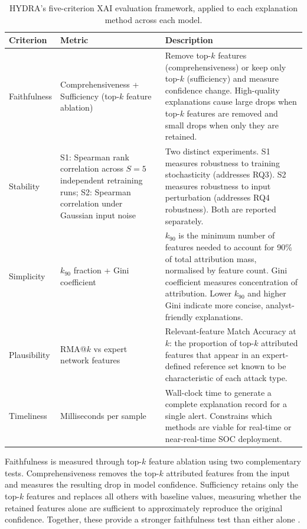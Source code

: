 \documentclass[12pt,a4paper]{report}
\begin{document}
\begin{table}[H]
\centering
\caption{HYDRA's five-criterion XAI evaluation framework, applied to each explanation method across each model.}
\label{tab:five-criteria}
\small
\begin{tabularx}{\textwidth}{lp{3.5cm}X}
\toprule
\textbf{Criterion} & \textbf{Metric} & \textbf{Description} \\
\midrule
Faithfulness & Comprehensiveness + Sufficiency (top-$k$ feature ablation) & Remove top-$k$ features (comprehensiveness) or keep only top-$k$ (sufficiency) and measure confidence change. High-quality explanations cause large drops when top-$k$ features are removed and small drops when only they are retained. \\
\addlinespace
Stability & S1: Spearman rank correlation across $S = 5$ independent retraining runs; S2: Spearman correlation under Gaussian input noise & Two distinct experiments. S1 measures robustness to training stochasticity (addresses RQ3). S2 measures robustness to input perturbation (addresses RQ4 robustness). Both are reported separately. \\
\addlinespace
Simplicity & $k_{90}$ fraction + Gini coefficient & $k_{90}$ is the minimum number of features needed to account for 90\% of total attribution mass, normalised by feature count. Gini coefficient measures concentration of attribution. Lower $k_{90}$ and higher Gini indicate more concise, analyst-friendly explanations. \\
\addlinespace
Plausibility & RMA@$k$ vs expert network features & Relevant-feature Match Accuracy at $k$: the proportion of top-$k$ attributed features that appear in an expert-defined reference set known to be characteristic of each attack type. \\
\addlinespace
Timeliness & Milliseconds per sample & Wall-clock time to generate a complete explanation record for a single alert. Constrains which methods are viable for real-time or near-real-time SOC deployment. \\
\bottomrule
\end{tabularx}
\end{table}

Faithfulness is measured through top-$k$ feature ablation using two complementary tests. Comprehensiveness removes the top-$k$ attributed features from the input and measures the resulting drop in model confidence. Sufficiency retains only the top-$k$ features and replaces all others with baseline values, measuring whether the retained features alone are sufficient to approximately reproduce the original confidence. Together, these provide a stronger faithfulness test than either alone \citep{bhatt2020,deyoung2020}.
\end{document}
